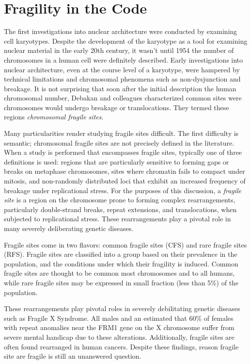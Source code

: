 \documentclass[phd,tocprelim]{cornell}
\begin{document}
\chapter{Fragility in the Code}

The first investigations into nuclear architecture were conducted by
examining cell karyotypes.  Despite the development of the karyotype as a
tool for examining nuclear material in the early 20th
century\cite{levitsky1924}, it wasn't until 1954 the number of chromosomes in
a human cell were definitely described\cite{tjio1956}.  Early investigations
into nuclear architecture, even at the course level of a karyotype, were
hampered by technical limitations and chromosomal phenomena such as
non-dysjunction and breakage.  It is not surprising that soon after the
initial description the human chromosomal number, Debakan and colleagues
characterized common sites were chromosomes would undergo breakage or
translocations.  They termed these regions
\textit{chromosomal fragile sites}\cite{leyden2008}.

Many particularities render studying fragile sites difficult.  The
first difficulty is semantic; chromosomal fragile sites are not precisely
defined in the literature.  When a study is performed that encompasses fragile
sites, typically one of three definitions is used: regions that are particularly
sensitive to forming gaps or breaks on metaphase chromosomes\cite{glover2005},
sites where chromatin fails to compact under mitosis\cite{leyden2008}, and
non-randomly distributed loci that exhibit an increased frequency of breakage
under replicational stress\cite{franchitto2013}.  For the purposes of this
discussion, a \textit{fragile site} is a region on the chromosome prone to
forming complex rearrangements, particularly double-strand breaks, repeat
extensions, and translocations, when subjected to replicational stress.  These
rearrangements play a pivotal role in many severely deliberating genetic
diseases.

Fragile sites come in two flavors: common fragile sites (CFS) and rare fragile
sites (RFS).  Fragile sites are classified into a group based on their
prevalence in the population, and the conditions under which their fragility
is induced\cite{leyden2008}.  Common fragile sites are thought to be common
most chromosomes and to all humans, while rare fragile sites may be expressed
in small fraction (less than 5\%) of the population\cite{wells2006}.

These
rearrangements play pivotal roles in severely debilitating genetic diseases
such as Fragile X Syndrome.  All males and an estimated that 60\% of females
with repeat anomalies near the FRM1 gene on the X chromosome suffer
from severe mental handicap due to these alterations\cite{sutherland1995}.
Additionally, fragile sites are often found rearranged in human
cancers\cite{glover2005}.  Despite these findings, reason fragile site are
fragile is still an unanswered question.
\end{document}
